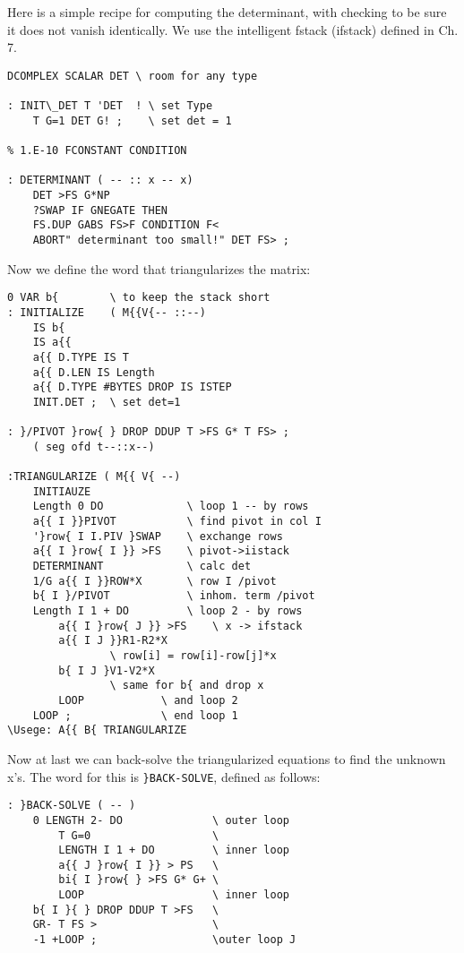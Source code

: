 Here is a simple recipe for computing the determinant, with
checking to be sure it does not vanish identically. We use the
intelligent fstack (ifstack) defined in Ch. 7.

\begin{verbatim}
DCOMPLEX SCALAR DET \ room for any type

: INIT\_DET T 'DET  ! \ set Type
    T G=1 DET G! ;    \ set det = 1

% 1.E-10 FCONSTANT CONDITION

: DETERMINANT ( -- :: x -- x)
    DET >FS G*NP
    ?SWAP IF GNEGATE THEN
    FS.DUP GABS FS>F CONDITION F<
    ABORT" determinant too small!" DET FS> ;
\end{verbatim} 


Now we define the word that triangularizes the matrix:
\begin{verbatim}
0 VAR b{        \ to keep the stack short
: INITIALIZE    ( M{{V{-- ::--)
    IS b{
    IS a{{
    a{{ D.TYPE IS T
    a{{ D.LEN IS Length
    a{{ D.TYPE #BYTES DROP IS ISTEP
    INIT.DET ;  \ set det=1

: }/PIVOT }row{ } DROP DDUP T >FS G* T FS> ;
    ( seg ofd t--::x--)

:TRIANGULARIZE ( M{{ V{ --)
    INITIAUZE
    Length 0 DO             \ loop 1 -- by rows
    a{{ I }}PIVOT           \ find pivot in col I
    '}row{ I I.PIV }SWAP    \ exchange rows
    a{{ I }row{ I }} >FS    \ pivot->iistack
    DETERMINANT             \ calc det
    1/G a{{ I }}ROW*X       \ row I /pivot
    b{ I }/PIVOT            \ inhom. term /pivot
    Length I 1 + DO         \ loop 2 - by rows
        a{{ I }row{ J }} >FS    \ x -> ifstack
        a{{ I J }}R1-R2*X 
                \ row[i] = row[i]-row[j]*x
        b{ I J }V1-V2*X
                \ same for b{ and drop x
        LOOP            \ and loop 2
    LOOP ;              \ end loop 1
\Usege: A{{ B{ TRIANGULARIZE
\end{verbatim}

Now at last we can back-solve the triangularized equations to find
the unknown x's. The word for this is \verb|}BACK-SOLVE|, defined
as follows:


\begin{verbatim}
: }BACK-SOLVE ( -- )
    0 LENGTH 2- DO              \ outer loop
        T G=0                   \
        LENGTH I 1 + DO         \ inner loop
        a{{ J }row{ I }} > PS   \
        bi{ I }row{ } >FS G* G+ \
        LOOP                    \ inner loop
    b{ I }{ } DROP DDUP T >FS   \
    GR- T FS >                  \
    -1 +LOOP ;                  \outer loop J
\end{verbatim} 

